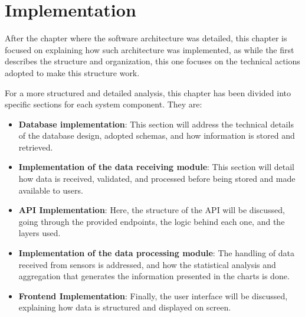 \chapter{Implementation}\label{cap:implementation}

After the chapter where the software architecture was detailed, this chapter is focused on explaining how such architecture was implemented, as while the first describes the structure and organization, this one focuses on the technical actions adopted to make this structure work.

For a more structured and detailed analysis, this chapter has been divided into specific sections for each system component. They are:

\begin{itemize}
    \item \textbf{Database implementation}: This section will address the technical details of the database design, adopted schemas, and how information is stored and retrieved.
    
    \item \textbf{Implementation of the data receiving module}: This section will detail how data is received, validated, and processed before being stored and made available to users.
    
    \item \textbf{API Implementation}: Here, the structure of the \gls{API} will be discussed, going through the provided endpoints, the logic behind each one, and the layers used.
    
    \item \textbf{Implementation of the data processing module}: The handling of data received from sensors is addressed, and how the statistical analysis and aggregation that generates the information presented in the charts is done.
    
    \item \textbf{Frontend Implementation}: Finally, the user interface will be discussed, explaining how data is structured and displayed on screen.
\end{itemize}







